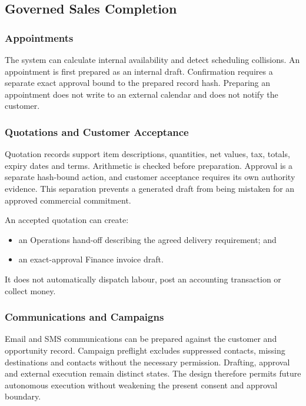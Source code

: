 \subsection{Governed Sales Completion}

\subsubsection{Appointments}

The system can calculate internal availability and detect scheduling collisions.  An appointment is first prepared as an internal draft.  Confirmation requires a separate exact approval bound to the prepared record hash.  Preparing an appointment does not write to an external calendar and does not notify the customer.

\subsubsection{Quotations and Customer Acceptance}

Quotation records support item descriptions, quantities, net values, tax, totals, expiry dates and terms.  Arithmetic is checked before preparation.  Approval is a separate hash-bound action, and customer acceptance requires its own authority evidence.  This separation prevents a generated draft from being mistaken for an approved commercial commitment.

An accepted quotation can create:

\begin{itemize}
  \item an Operations hand-off describing the agreed delivery requirement; and
  \item an exact-approval Finance invoice draft.
\end{itemize}

It does not automatically dispatch labour, post an accounting transaction or collect money.

\subsubsection{Communications and Campaigns}

Email and SMS communications can be prepared against the customer and opportunity record.  Campaign preflight excludes suppressed contacts, missing destinations and contacts without the necessary permission.  Drafting, approval and external execution remain distinct states.  The design therefore permits future autonomous execution without weakening the present consent and approval boundary.

